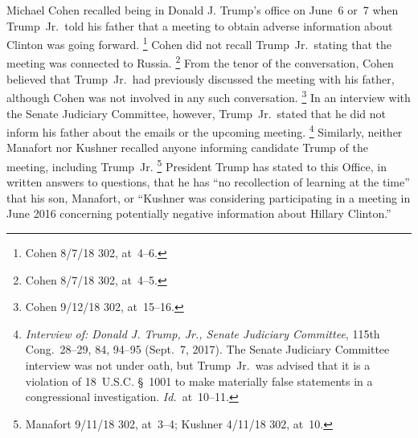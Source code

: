 Michael Cohen recalled being in Donald J. Trump's office on June~6 or~7 when Trump~Jr.\ told his father that a meeting to obtain adverse information about Clinton was going forward.%
\footnote{Cohen 8/7/18 302, at~4--6.}
Cohen did not recall Trump~Jr.\ stating that the meeting was connected to Russia.%
\footnote{Cohen 8/7/18 302, at~4--5.}
From the tenor of the conversation, Cohen believed that Trump~Jr.\ had previously discussed the meeting with his father, although Cohen was not involved in any such conversation.%
\footnote{Cohen 9/12/18 302, at~15--16.}
In an interview with the Senate Judiciary Committee, however, Trump~Jr.\ stated that he did not inform his father about the emails or the upcoming meeting.%
\footnote{\textit{Interview of: Donald J. Trump, Jr., Senate Judiciary Committee}, 115th Cong.~28--29, 84, 94--95
(Sept.~7, 2017).
The Senate Judiciary Committee interview was not under oath, but Trump~Jr.\ was advised that it is a violation of 18~U.S.C. \S~1001 to make materially false statements in a congressional investigation.
\textit{Id.}~at~10--11.}
Similarly, neither Manafort nor Kushner recalled anyone informing candidate Trump of the meeting, including Trump~Jr.%
\footnote{Manafort 9/11/18 302, at~3--4;
Kushner 4/11/18 302, at~10.}
President Trump has stated to this Office, in written answers to questions, that he has ``no recollection of learning at the time'' that his son, Manafort, or ``Kushner was considering participating in a meeting in June 2016 concerning potentially negative information about Hillary Clinton.''%
